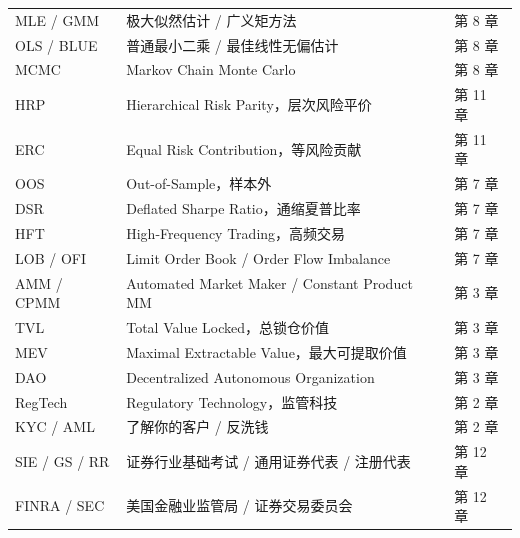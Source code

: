 {\begin{longtable}{@{}L{2.75cm}L{9.05cm}L{2.9cm}@{}}
MLE / GMM & 极大似然估计 / 广义矩方法 & 第 8 章 \\
OLS / BLUE & 普通最小二乘 / 最佳线性无偏估计 & 第 8 章 \\
MCMC & Markov Chain Monte Carlo & 第 8 章 \\
HRP & Hierarchical Risk Parity，层次风险平价 & 第 11 章 \\
ERC & Equal Risk Contribution，等风险贡献 & 第 11 章 \\
OOS & Out-of-Sample，样本外 & 第 7 章 \\
DSR & Deflated Sharpe Ratio，通缩夏普比率 & 第 7 章 \\
HFT & High-Frequency Trading，高频交易 & 第 7 章 \\
LOB / OFI & Limit Order Book / Order Flow Imbalance & 第 7 章 \\
AMM / CPMM & Automated Market Maker / Constant Product MM & 第 3 章 \\
TVL & Total Value Locked，总锁仓价值 & 第 3 章 \\
MEV & Maximal Extractable Value，最大可提取价值 & 第 3 章 \\
DAO & Decentralized Autonomous Organization & 第 3 章 \\
RegTech & Regulatory Technology，监管科技 & 第 2 章 \\
KYC / AML & 了解你的客户 / 反洗钱 & 第 2 章 \\
SIE / GS / RR & 证券行业基础考试 / 通用证券代表 / 注册代表 & 第 12 章 \\
FINRA / SEC & 美国金融业监管局 / 证券交易委员会 & 第 12 章 \\
\end{longtable}
}

\clearpage
